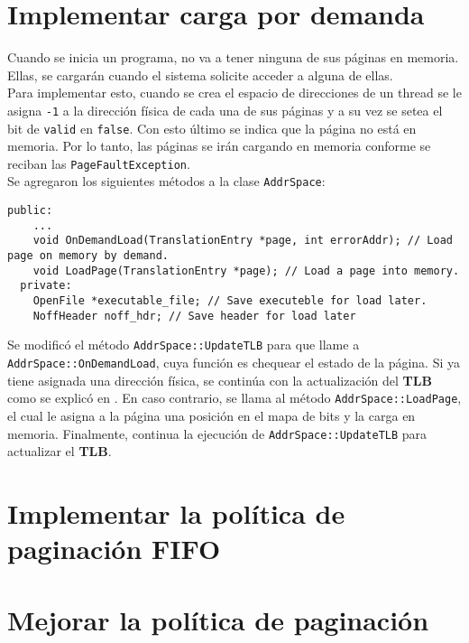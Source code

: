 \section{Implementar carga por demanda}
Cuando se inicia un programa, no va a tener ninguna de sus páginas en memoria. Ellas, se cargarán cuando el sistema solicite acceder a alguna de ellas.\\
Para implementar esto, cuando se crea el espacio de direcciones de un thread se le asigna \texttt{-{}1} a la dirección física de cada una de sus páginas y a su vez se setea el bit de \texttt{valid} en \texttt{false}. Con esto último se indica que la página no está en memoria. Por lo tanto, las páginas se irán cargando en memoria conforme se reciban las \texttt{PageFaultException}.\\
Se agregaron los siguientes métodos a la clase \texttt{AddrSpace}:
\begin{lstlisting}[style=C]
  public:
    ...
    void OnDemandLoad(TranslationEntry *page, int errorAddr); // Load page on memory by demand.
    void LoadPage(TranslationEntry *page); // Load a page into memory.
  private:
    OpenFile *executable_file; // Save executeble for load later.
    NoffHeader noff_hdr; // Save header for load later
\end{lstlisting}
Se modificó el método \texttt{AddrSpace::UpdateTLB} para que llame a \texttt{AddrSpace::OnDemandLoad}, cuya función es chequear el estado de la página. Si ya tiene asignada una dirección física, se continúa con la actualización del \textbf{TLB} como se explicó en . En caso contrario, se llama al método \texttt{AddrSpace::LoadPage}, el cual le asigna a la página una posición en el mapa de bits y la carga en memoria. Finalmente, continua la ejecución de \texttt{AddrSpace::UpdateTLB} para actualizar el \textbf{TLB}.
\section{Implementar la política de paginación FIFO}
\section{Mejorar la política de paginación}